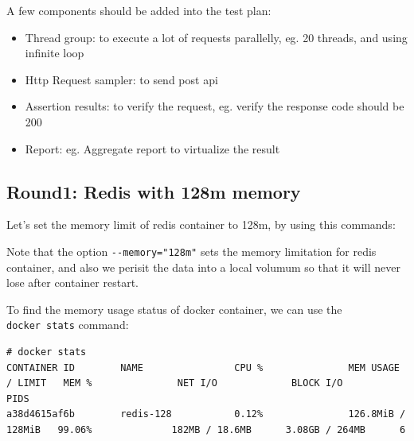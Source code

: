\documentclass[12pt]{article}
\begin{document}
A few components should be added into the test plan:

\begin{itemize}
\tightlist
\item
  Thread group: to execute a lot of requests parallelly, eg. 20 threads, and using infinite loop
\item
  Http Request sampler: to send post api
\item
  Assertion results: to verify the request, eg. verify the response code should be 200
\item
  Report: eg. Aggregate report to virtualize the result
\end{itemize}

\subsection{Round1: Redis with 128m memory}\label{round1-redis-with-128m-memory}

Let's set the memory limit of redis container to 128m, by using this commands:

\begin{Shaded}
\begin{Highlighting}[]
\DataTypeTok{\textbackslash{}}
            \DataTypeTok{\textbackslash{}}
           \DataTypeTok{\textbackslash{}}
           \OperatorTok{=} \DataTypeTok{\textbackslash{}}
           \DataTypeTok{\textbackslash{}}
\end{Highlighting}
\end{Shaded}

Note that the option \texttt{-\/-memory="128m"} sets the memory limitation for redis container, and also we perisit the data into a local volumum so that it will never lose after container restart.

To find the memory usage status of docker container, we can use the \texttt{docker\ stats} command:

\begin{verbatim}
# docker stats
CONTAINER ID        NAME                CPU %               MEM USAGE / LIMIT   MEM %               NET I/O             BLOCK I/O           PIDS
a38d4615af6b        redis-128           0.12%               126.8MiB / 128MiB   99.06%              182MB / 18.6MB      3.08GB / 264MB      6
\end{verbatim}
\end{document}
